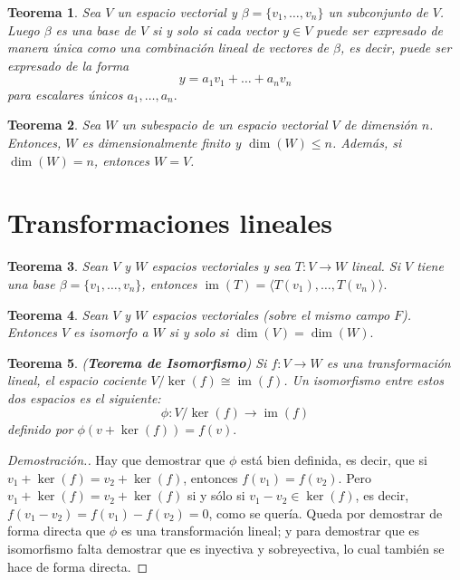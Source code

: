 \documentclass[12pt]{book}
\newtheorem{theorem}{Teorema}[section]
\theoremstyle{definition}
\DeclareMathOperator{\im}{im}
\newcounter{in}
\newcounter{ini}
\begin{document}
\begin{theorem}
  \label{clunica}
  Sea $V$ un espacio vectorial y $\beta=\{v_{1},\dots,v_{n}\}$ un
  subconjunto de $V$. Luego $\beta$ es una base de $V$ si y solo si
  cada vector $y\in V$ puede ser expresado de manera única como una
  combinación lineal de vectores de $\beta$, es decir, puede ser
  expresado de la forma
  $$y=a_{1}v_{1}+\ldots+a_{n}v_{n}$$
  para escalares únicos $a_{1},\ldots,a_{n}.$
\end{theorem}

\begin{theorem}
  \label{esp-iguales}
  Sea $W$ un subespacio de un espacio vectorial $V$ de dimensión
  $n$. Entonces, $W$ es dimensionalmente finito y $\dim(W)\leq
  n$. Además, si $\dim(W)=n$, entonces $W=V$.
\end{theorem}

\section{Transformaciones lineales}

\begin{theorem}
  \label{imT}
  Sean $V$ y $W$ espacios vectoriales y sea $T:V \rightarrow W$
  lineal. Si $V$ tiene una base $\beta=\{v_{1},\ldots,v_{n}\}$,
  entonces $\im(T)=\langle T(v_{1}),\ldots,T(v_{n})\rangle.$  
\end{theorem}

\begin{theorem}
  \label{esp-isomorfos}
  Sean $V$ y $W$ espacios vectoriales (sobre el mismo campo
  $F$). Entonces $V$ es isomorfo a $W$ si y solo si $\dim (V)=\dim(W).$ 
\end{theorem}

\begin{theorem}{(\textbf{Teorema de Isomorfismo})}
  \label{teorema-isomorfismo-esp}
  Si $f:V\rightarrow W$ es una transformación lineal, el espacio
  cociente $V/\ker(f)\cong \im(f)$. Un isomorfismo entre estos dos
  espacios es el siguiente:
  $$\phi:V/\ker(f)\rightarrow \im(f)$$
  definido por $\phi(v+\ker(f))=f(v).$
\end{theorem}
\begin{proof}[Demostración.]
  Hay que demostrar que $\phi$ está bien definida, es decir, que si
  $v_1+\ker(f)=v_2+\ker(f)$, entonces
  $f(v_1)=f(v_{2}).$ Pero
  $v_1+\ker(f)=v_2+\ker(f)$ si y sólo si
  $v_{1}-v_{2}\in \ker(f)$, es decir,
  $f(v_{1}-v_{2})=f(v_1)-f(v_2)=0$,
  como se quería. Queda por demostrar de forma directa que $\phi$ es
  una transformación lineal; y para demostrar que es isomorfismo falta
  demostrar que es inyectiva y sobreyectiva, lo cual también se hace
  de forma directa.
\end{proof}
\end{document}
